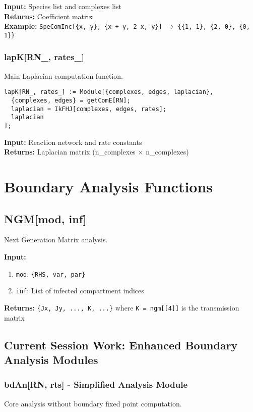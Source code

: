 \documentclass{article}
\begin{document}
\textbf{Input:} Species list and complexes list\\
\textbf{Returns:} Coefficient matrix\\
\textbf{Example:} \texttt{SpeComInc[\{x, y\}, \{x + y, 2 x, y\}]} $\rightarrow$ \texttt{\{\{1, 1\}, \{2, 0\}, \{0, 1\}\}}

\subsubsection{lapK[RN\_, rates\_]}
Main Laplacian computation function.

\begin{lstlisting}
lapK[RN_, rates_] := Module[{complexes, edges, laplacian},
  {complexes, edges} = getComE[RN];
  laplacian = IkFHJ[complexes, edges, rates];
  laplacian
];
\end{lstlisting}

\textbf{Input:} Reaction network and rate constants\\
\textbf{Returns:} Laplacian matrix (n\_complexes $\times$ n\_complexes)

\section{Boundary Analysis Functions}

\subsection{NGM[mod, inf]}
Next Generation Matrix analysis.

\textbf{Input:}
\begin{enumerate}
\item \texttt{mod}: \texttt{\{RHS, var, par\}}
\item \texttt{inf}: List of infected compartment indices
\end{enumerate}

\textbf{Returns:} \texttt{\{Jx, Jy, ..., K, ...\}} where \texttt{K = ngm[[4]]} is the transmission matrix

\subsection{Current Session Work: Enhanced Boundary Analysis Modules}

\subsubsection{bdAn[RN, rts] - Simplified Analysis Module}
Core analysis without boundary fixed point computation.
\end{document}
